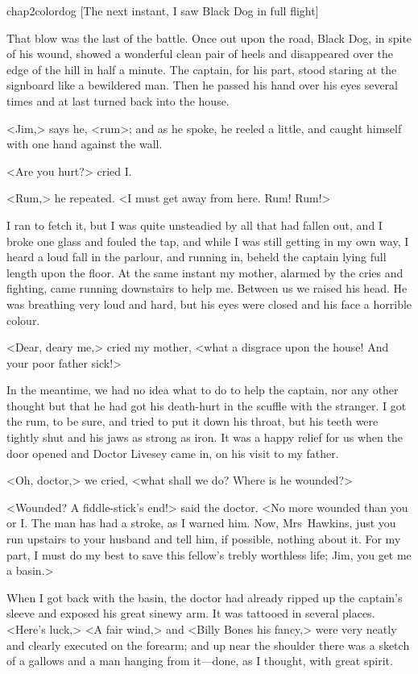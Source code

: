 \begin{colorbigpic}
	[\basicscale]
	{chap2colordog}
	[The next instant, I saw Black Dog in full flight]
\end{colorbigpic}

That blow was the last of the battle. Once out upon the road, Black Dog, in spite of his wound, showed a wonderful clean pair of heels and disappeared over the edge of the hill in half a minute. The captain, for his part, stood staring at the signboard like a bewildered man. Then he passed his hand over his eyes several times and at last turned back into the house.

<Jim,> says he, <rum>; and as he spoke, he reeled a little, and caught himself with one hand against the wall.

<Are you hurt?> cried I\@.

<Rum,> he repeated. <I must get away from here. Rum! Rum!>

I ran to fetch it, but I was quite unsteadied by all that had fallen out, and I broke one glass and fouled the tap, and while I was still getting in my own way, I heard a loud fall in the parlour, and running in, beheld the captain lying full length upon the floor. At the same instant my mother, alarmed by the cries and fighting, came running downstairs to help me. Between us we raised his head. He was breathing very loud and hard, but his eyes were closed and his face a horrible colour.

<Dear, deary me,> cried my mother, <what a disgrace upon the house! And your poor father sick!>

In the meantime, we had no idea what to do to help the captain, nor any other thought but that he had got his death-hurt in the scuffle with the stranger. I got the rum, to be sure, and tried to put it down his throat, but his teeth were tightly shut and his jaws as strong as iron. It was a happy relief for us when the door opened and Doctor Livesey came in, on his visit to my father.

<Oh, doctor,> we cried, <what shall we do? Where is he wounded?>

<Wounded? A fiddle-stick's end!> said the doctor. <No more wounded than you or I\@. The man has had a stroke, as I warned him. Now, Mrs~Hawkins, just you run upstairs to your husband and tell him, if possible, nothing about it. For my part, I must do my best to save this fellow's trebly worthless life; Jim, you get me a basin.>

When I got back with the basin, the doctor had already ripped up the captain's sleeve and exposed his great sinewy arm. It was tattooed in several places. <Here's luck,> <A fair wind,> and <Billy Bones his fancy,> were very neatly and clearly executed on the forearm; and up near the shoulder there was a sketch of a gallows and a man hanging from it—done, as I thought, with great spirit.

